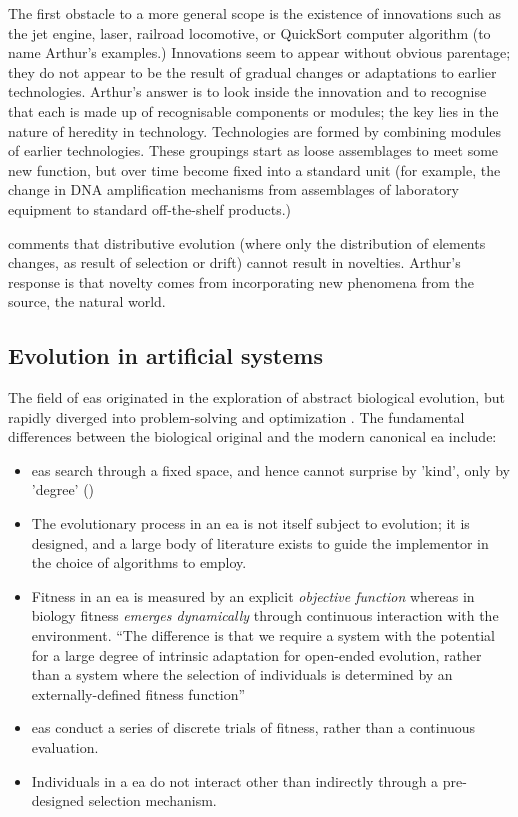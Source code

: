 The first obstacle to a more general scope is the existence of innovations such as the jet engine, laser, railroad locomotive, or QuickSort computer algorithm (to name Arthur's examples.) Innovations seem to appear without obvious parentage; they do not appear to be the result of gradual changes or adaptations to earlier technologies. Arthur's answer is to look inside the innovation and to recognise that each is made up of recognisable components or modules; the key lies in the nature of heredity in technology. Technologies are formed by combining modules of earlier technologies. These groupings start as loose assemblages to meet some new function, but over time become fixed into a standard unit (for example, the change in DNA amplification mechanisms from assemblages of laboratory equipment to standard off-the-shelf products.)

\parencite{Bourrat2015} comments that distributive evolution (where only the distribution of elements changes, as result of selection or drift) cannot result in novelties. Arthur's response is that novelty comes from incorporating new phenomena from the source, the natural world.

\subsection{Evolution in artificial systems}

The field of \glspl{ea} originated in the exploration of abstract biological evolution, but rapidly diverged into problem-solving and optimization \cite{De-Jong:1993gy,DeJong2006}. The fundamental differences between the biological original and the modern canonical \gls{ea} include:

\begin{itemize}
\item \Glspl{ea} search through a fixed space, and hence cannot surprise by 'kind', only by 'degree' (\eg \parencite{Nellis2014})
\item The evolutionary process in an \gls{ea} is not itself subject to evolution; it is designed, and a large body of literature exists to guide the implementor in the choice of algorithms to employ.
\item Fitness in an \gls{ea} is measured by an explicit \emph{objective function} whereas in biology fitness \emph{emerges dynamically} through continuous interaction with the environment. ``The difference is that we require a system with the potential for a large degree of intrinsic adaptation for open-ended evolution, rather than a system where the selection of individuals is determined by an externally-defined fitness function'' \parencite{Taylor2001}
\item \Glspl{ea} conduct a series of discrete trials of fitness, rather than a continuous evaluation.
\item Individuals in a \gls{ea} do not interact other than indirectly through a pre-designed selection mechanism.
\end{itemize}

